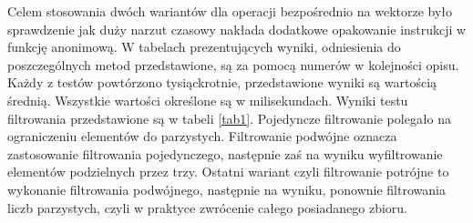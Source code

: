 \documentclass[a4paper,10pt]{report}
\begin{document}
Celem stosowania dwóch wariantów dla operacji bezpośrednio na wektorze było sprawdzenie jak duży narzut czasowy nakłada dodatkowe opakowanie instrukcji w funkcję anonimową.
W tabelach prezentujących wyniki, odniesienia do poszczególnych metod przedstawione, są za pomocą numerów w kolejności opisu.
Każdy z testów powtórzono tysiąckrotnie, przedstawione wyniki są wartością średnią. Wszystkie wartości określone są w milisekundach.
Wyniki testu filtrowania przedstawione są w tabeli \ref{tab1}. Pojedyncze filtrowanie polegało na ograniczeniu elementów do parzystych. Filtrowanie podwójne oznacza zastosowanie filtrowania pojedynczego, następnie zaś na wyniku wyfiltrowanie elementów podzielnych przez trzy. Ostatni wariant czyli filtrowanie potrójne to wykonanie filtrowania podwójnego, następnie na wyniku, ponownie filtrowania liczb parzystych, czyli w praktyce zwrócenie całego posiadanego zbioru.
\end{document}
